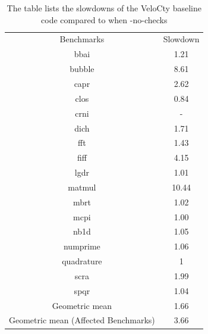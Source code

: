 \begin{table}[htbp]
\centering
\begin{tabular}{|c|c|}
\hline
Benchmarks                           & Slowdown     \\ \hhline{|=|=|}
bbai                                 & 1.21  \\ \hline
bubble                               & 8.61  \\ \hline
capr                                 & 2.62   \\ \hline
clos                                 & 0.84 \\ \hline
crni                                 & -            \\ \hline
dich                                 & 1.71\\ \hline
fft                                  & 1.43\\ \hline
fiff                                 & 4.15\\ \hline
lgdr                                 & 1.01\\ \hline
matmul                               & 10.44\\ \hline
mbrt                                 & 1.02\\ \hline
mcpi                                 & 1.00\\ \hline
nb1d                                 & 1.05\\ \hline
numprime                             & 1.06\\ \hline
quadrature                           & 1            \\ \hline
scra                                 & 1.99\\ \hline
spqr                                 & 1.04\\ \hline
Geometric mean                       & 1.66\\ \hline
Geometric mean (Affected Benchmarks) & 3.66\\ \hline
\end{tabular}
\caption[Slowdown of \velocty with checks enabled]{The table lists the slowdowns of the  VeloCty baseline code  compared to when \velocty-no-checks}
\label{tab:CwovsCw}
\end{table}
